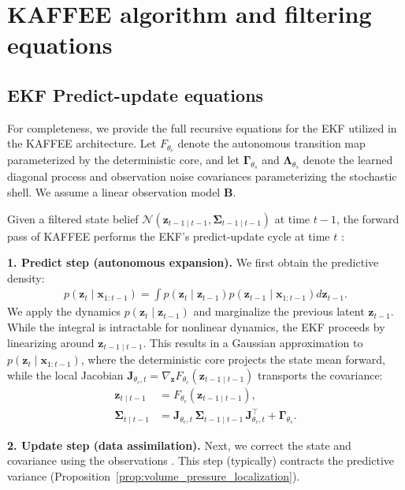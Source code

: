 \documentclass{article}
\theoremstyle{plain}
\theoremstyle{definition}
\theoremstyle{remark}
\begin{document}
\section{KAFFEE algorithm and filtering equations}
\label{app:kaffee_algorithm}

\subsection{EKF Predict-update equations}
\label{app:ekf_equations}

For completeness, we provide the full recursive equations for the EKF utilized in the KAFFEE architecture. Let $F_{\theta_c}$ denote the autonomous transition map parameterized by the deterministic core, and let $\bm{\Gamma}_{\theta_s}$ and $\bm{\Lambda}_{\theta_s}$ denote the learned diagonal process and observation noise covariances parameterizing the stochastic shell. We assume a linear observation model $\bm{B}$.

Given a filtered state belief $\mathcal{N}(\bm{z}_{t-1\mid t-1}, \bm{\Sigma}_{t-1\mid t-1})$ at time $t-1$, the forward pass of KAFFEE performs the EKF's predict-update cycle at time $t$ \citep{sarkka2023bayesian}:

\textbf{1. Predict step (autonomous expansion).}
We first obtain the predictive density:
\begin{align*}
    p(\bm z _t\mid \bm x_{1:t-1})=\int p(\bm z_t \mid \bm z_{t-1})p(\bm z _{t-1}\mid \bm x_{1:t-1}) d\bm z_{t-1}.
\end{align*}
We apply the dynamics $p(\bm z_t \mid \bm z_{t-1})$ and marginalize the previous latent $\bm z_{t-1}$. While the integral is intractable for nonlinear dynamics, the EKF proceeds by linearizing around $\bm{z}_{t-1 \mid t-1}$. This results in a Gaussian approximation to $p(\bm z _t\mid \bm x_{1:t-1})$, where
the deterministic core projects the state mean forward, while the local Jacobian $\bm{J}_{\theta_c, t} = \nabla_{\bm{z}} F_{\theta_c}(\bm{z}_{t-1 \mid t-1})$ transports the covariance:
\begin{align}
\bm{z}_{t\mid t-1} &= F_{\theta_c}(\bm{z}_{t-1\mid t-1}) \label{eq:kf_predict_mean}, \\
\bm{\Sigma}_{t\mid t-1} &= \bm{J}_{\theta_c, t} \, \bm{\Sigma}_{t-1\mid t-1} \, \bm{J}_{\theta_c, t}^\top + \bm{\Gamma}_{\theta_s} \label{eq:kf_predict_cov}.
\end{align}


\textbf{2. Update step (data assimilation).}
Next, we correct the state and covariance using the observations \citep{reich2015probabilistic,carrassi2018data}. This step (typically) contracts the predictive variance (Proposition~\ref{prop:volume_pressure_localization}).
\end{document}
